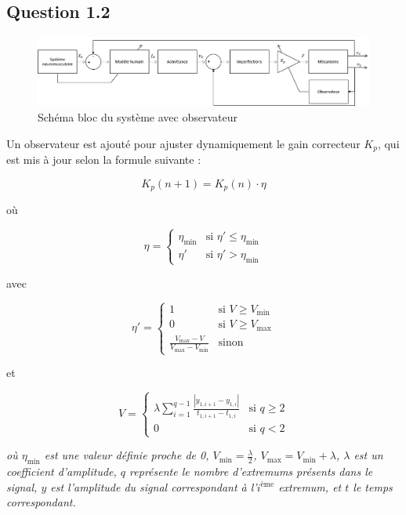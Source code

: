 \documentclass[a4paper,11pt]{article}
\begin{document}
\subsection{Question 1.2}
\begin{figure}[h!]
    \centering
    \includegraphics[width=16cm]{./img/SchemaBlocAvecObs.png}
    \caption{Schéma bloc du système avec observateur\label{fig:SchemaBlocAvecObs}}
\end{figure}

Un observateur est ajouté pour ajuster dynamiquement le gain correcteur $K_{p}$, qui est mis à jour selon la formule suivante :

\[
K_{p}(n+1) = K_{p}(n) \cdot \eta
\]
\begin{center}
    où
\end{center}

\[
\eta = 
\begin{cases}
    \eta_{\text{min}} & \text{si } \eta' \leq \eta_{\text{min}} \\
    \eta' & \text{si } \eta' > \eta_{\text{min}}
\end{cases}
\]

\begin{center}
    avec
\end{center}

\[
\eta' = 
\begin{cases}
    1 & \text{si } V \geq V_{\text{min}} \\
    0 & \text{si } V \geq V_{\text{max}} \\
    \frac{V_{\text{max}} - V}{V_{\text{max}} - V_{\text{min}}} & \text{sinon}
\end{cases}
\]

\begin{center}
    et
\end{center}

\[
V = 
\begin{cases}
    \lambda \sum_{i=1}^{q-1} \frac{\left| y_{1,i+1} - y_{1,i} \right|}{t_{1,i+1} - t_{1,i}} & \text{si } q \geq 2 \\
    0 & \text{si } q < 2
\end{cases}
\]

\textit{
    où $\eta_{\text{min}}$ est une valeur définie proche de 0, $V_{\text{min}} = \frac{\lambda}{2}$, $V_{\text{max}} = V_{\text{min}} + \lambda$, $\lambda$ est un coefficient d’amplitude, $q$ représente le nombre d’extremums présents dans le signal, $y$ est l’amplitude du signal correspondant à l'${i}^{\text{ème}}$ extremum, et $t$ le temps correspondant.
}
\end{document}

